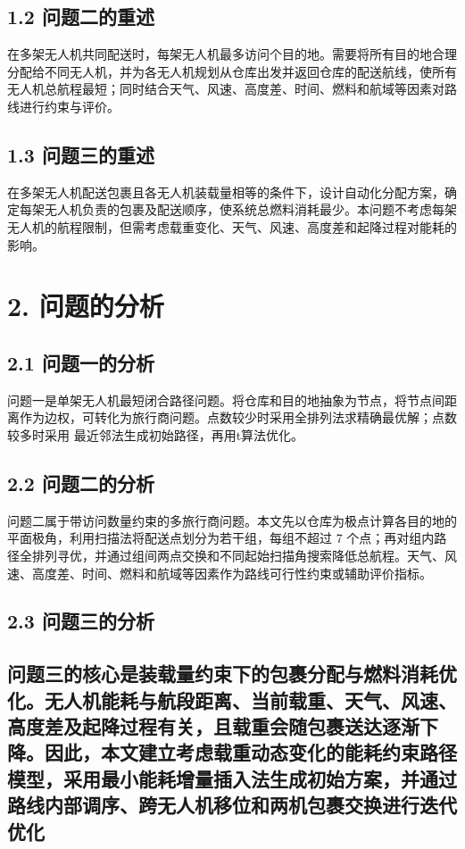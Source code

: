 \documentclass[UTF8,fontset=windows,12pt,a4paper]{ctexart}
\begin{document}
\subsection*{1.2 问题二的重述}
在多架无人机共同配送时，每架无人机最多访问个目的地。需要将所有目的地合理分配给不同无人机，并为各无人机规划从仓库出发并返回仓库的配送航线，使所有无人机总航程最短；同时结合天气、风速、高度差、时间、燃料和航域等因素对路线进行约束与评价。

\subsection*{1.3 问题三的重述}
在多架无人机配送包裹且各无人机装载量相等的条件下，设计自动化分配方案，确定每架无人机负责的包裹及配送顺序，使系统总燃料消耗最少。本问题不考虑每架无人机的航程限制，但需考虑载重变化、天气、风速、高度差和起降过程对能耗的影响。

\section*{2. 问题的分析}
\subsection*{2.1 问题一的分析}
问题一是单架无人机最短闭合路径问题。将仓库和目的地抽象为节点，将节点间距离作为边权，可转化为旅行商问题。点数较少时采用全排列法求精确最优解；点数较多时采用  最近邻法生成初始路径，再用t算法优化。

\subsection*{2.2 问题二的分析}
问题二属于带访问数量约束的多旅行商问题。本文先以仓库为极点计算各目的地的平面极角，利用扫描法将配送点划分为若干组，每组不超过 7 个点；再对组内路径全排列寻优，并通过组间两点交换和不同起始扫描角搜索降低总航程。天气、风速、高度差、时间、燃料和航域等因素作为路线可行性约束或辅助评价指标。

\subsection*{2.3 问题三的分析}
\subsection*{问题三的核心是装载量约束下的包裹分配与燃料消耗优化。无人机能耗与航段距离、当前载重、天气、风速、高度差及起降过程有关，且载重会随包裹送达逐渐下降。因此，本文建立考虑载重动态变化的能耗约束路径模型，采用最小能耗增量插入法生成初始方案，并通过路线内部调序、跨无人机移位和两机包裹交换进行迭代优化}
\end{document}
